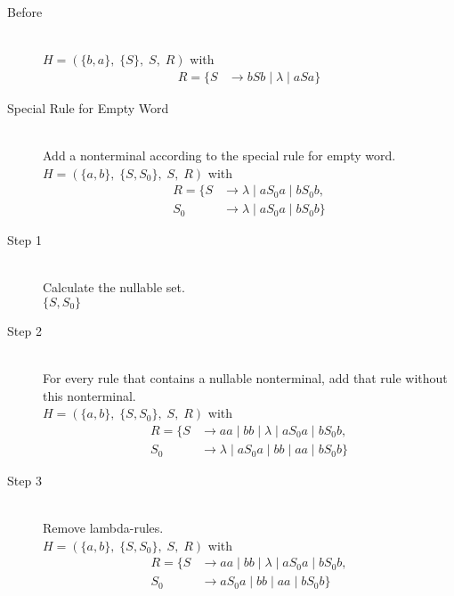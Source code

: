 \begin{description}
	\item[Before] \hfill \\ 
		$H=(\{	b, a\},\;\{ S\},\;S,\;R)$ with
	\begin{align*}
		R=\{	S &\rightarrow bSb\;|\;\lambda\;|\;aSa\}
	\end{align*}
	\item[Special Rule for Empty Word] \hfill \\ 
	Add a nonterminal according to the special rule for empty word.\\ 
	$H=(\{	a, b\},\;\{ S, S_{0}\},\;S,\;R)$ with
	\begin{align*}
		R=\{	S &\rightarrow \lambda\;|\;aS_{0} a\;|\;bS_{0} b, \\ 
		S_{0}  &\rightarrow \lambda\;|\;aS_{0} a\;|\;bS_{0} b\}
	\end{align*}
	\item[Step 1] \hfill \\ 
	Calculate the nullable set.\\ 
	$\{	S, 	S_0\}$
	\item[Step 2] \hfill \\ 
	For every rule that contains a nullable nonterminal, add that rule without this nonterminal.\\ 
	$H=(\{	a, b\},\;\{ S, S_{0}\},\;S,\;R)$ with
	\begin{align*}
		R=\{	S &\rightarrow aa\;|\;bb\;|\;\lambda\;|\;aS_{0} a\;|\;bS_{0} b, \\ 
		S_{0}  &\rightarrow \lambda\;|\;aS_{0} a\;|\;bb\;|\;aa\;|\;bS_{0} b\}
	\end{align*}
	\item[Step 3] \hfill \\ 
	Remove lambda-rules.\\ 
	$H=(\{	a, b\},\;\{ S, S_{0}\},\;S,\;R)$ with
	\begin{align*}
		R=\{	S &\rightarrow aa\;|\;bb\;|\;\lambda\;|\;aS_{0} a\;|\;bS_{0} b, \\ 
		S_{0}  &\rightarrow aS_{0} a\;|\;bb\;|\;aa\;|\;bS_{0} b\}
	\end{align*}
\end{description}